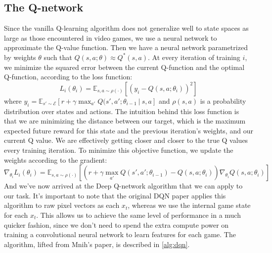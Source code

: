 \documentclass{article}
\begin{document}
\subsection{The Q-network}
Since the vanilla Q-learning algorithm does not generalize well to state spaces as large as those encountered in video games, we use a neural network to approximate the Q-value function. 
Then we have a neural network parametrized by weights $\theta$ such that $Q(s, a; \theta) \approx Q^{*}(s, a)$.
At every iteration of training $i$, we minimize the squared error between the current Q-function and the optimal Q-function, according to the loss function:
\begin{equation}
\displaystyle L_i(\theta_i) = \mathbb{E}_{s, a \sim \rho(\cdot)}[(y_i - Q(s, a; \theta_i))^2]
\end{equation}
where $y_i = \mathbb{E}_{s' \sim \mathcal{E}}[r + \gamma\max_{a'}Q(s', a'; \theta_{i - 1}\ |\ s, a]$ and $\rho(s, a)$ is a probability distribution over states and actions. 
The intuition behind this loss function is that we are minimizing the distance between our target, which is the maximum expected future reward for this state and the previous iteration's weights, and our current Q value.
We are effectively getting closer and closer to the true Q values every training iteration.
To minimize this objective function, we update the weights according to the gradient:
\begin{equation}
\displaystyle \nabla_{\theta_i}L_i(\theta_i) = \mathbb{E}_{s, a \sim \rho(\cdot)}[(r + \gamma \max_{a'}Q(s', a'; \theta_{i - 1}) - Q(s, a; \theta_i))\nabla_{\theta_i}Q(s, a; \theta_i)]
\label{eq:gd}
\end{equation}
And we've now arrived at the Deep Q-network algorithm that we can apply to our task.
It's important to note that the original DQN paper applies this algorithm to raw pixel vectors as each $x_t$, whereas we use the internal game state for each $x_t$.
This allows us to achieve the same level of performance in a much quicker fashion, since we don't need to spend the extra compute power on training a convolutional neural network to learn features for each game.
The algorithm, lifted from Mnih's paper, is described in \ref{alg:dqn}.
\end{document}
